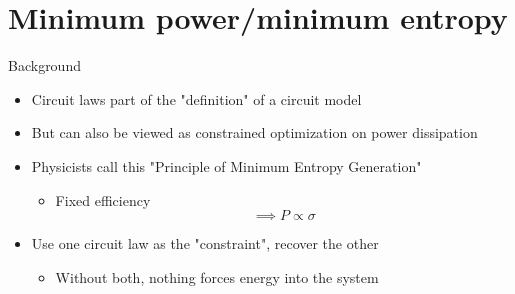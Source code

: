 \section{Minimum power/minimum entropy}

\begin{frame}{Background}
\begin{itemize}
\item Circuit laws part of the "definition" of a circuit model
\item But can also be viewed as constrained optimization on power dissipation
\item Physicists call this "Principle of Minimum Entropy Generation"
    \begin{itemize}
  \item Fixed efficiency $$\implies P \varpropto \sigma$$
      \end{itemize}
\item Use one circuit law as the "constraint", recover the other
    \begin{itemize}
  \item Without both, nothing forces energy into the system
  \end{itemize}
\end{itemize}

\end{frame}



